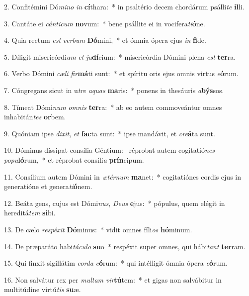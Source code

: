 2. Confitémini Dó\textit{mi}\textit{no} \textit{in} \textbf{cí}thara:~*  in psaltério decem chordárum psálli\textit{te} \textbf{il}li.\

3. Cantáte ei \textit{cán}\textit{ti}\textit{cum} \textbf{no}vum:~*  bene psállite ei in vocifera\textit{ti}\textbf{ó}ne.\

4. Quia rectum \textit{est} \textit{ver}\textit{bum} \textbf{Dó}mini,~*  et ómnia ópera ejus \textit{in} \textbf{fi}de.\

5. Díligit misericórdi\textit{am} \textit{et} \textit{ju}\textbf{dí}cium:~*  misericórdia Dómini plena \textit{est} \textbf{ter}ra.\

6. Verbo Dómini \textit{cæ}\textit{li} \textit{fir}\textbf{má}ti sunt:~*  et spíritu oris ejus omnis virtus \textit{e}\textbf{ó}rum.\

7. Cóngregans sicut in u\textit{tre} \textit{a}\textit{quas} \textbf{ma}ris:~*  ponens in thesáuris \textit{a}\textbf{býs}sos.\

8. Tímeat Dómi\textit{num} \textit{om}\textit{nis} \textbf{ter}ra:~*  ab eo autem commoveántur omnes inhabitán\textit{tes} \textbf{or}bem.\

9. Quóniam ipse \textit{di}\textit{xit}, \textit{et} \textbf{fac}ta sunt:~*  ipse mandávit, et \textit{cre}\textbf{á}ta sunt.\

10. Dóminus díssipat consília Géntium: \dag\  réprobat autem cogitatió\textit{nes} \textit{po}\textit{pu}\textbf{ló}rum,~*  et réprobat consíli\textit{a} \textbf{prín}cipum.\

11. Consílium autem Dómini in \textit{æ}\textit{tér}\textit{num} \textbf{ma}net:~*  cogitatiónes cordis ejus in generatióne et genera\textit{ti}\textbf{ó}nem.\

12. Beáta gens, cujus est Dómi\textit{nus}, \textit{De}\textit{us} \textbf{e}jus:~*  pópulus, quem elégit in hereditá\textit{tem} \textbf{si}bi.\

13. De cælo \textit{re}\textit{spé}\textit{xit} \textbf{Dó}minus:~*  vidit omnes fíli\textit{os} \textbf{hó}minum.\

14. De præparáto habi\textit{tá}\textit{cu}\textit{lo} \textbf{su}o~*  respéxit super omnes, qui hábi\textit{tant} \textbf{ter}ram.\

15. Qui finxit sigillátim \textit{cor}\textit{da} \textit{e}\textbf{ó}rum:~*  qui intélligit ómnia ópera \textit{e}\textbf{ó}rum.\

16. Non salvátur rex per \textit{mul}\textit{tam} \textit{vir}\textbf{tú}tem:~*  et gigas non salvábitur in multitúdine virtú\textit{tis} \textbf{su}æ.\

